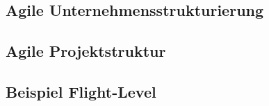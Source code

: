 \subsection{Agile Unternehmensstrukturierung}

\subsection{Agile Projektstruktur}

\subsection{Beispiel Flight-Level}
